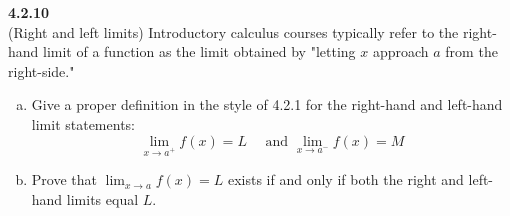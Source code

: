 \textbf{4.2.10}
\\

(Right and left limits) Introductory calculus courses typically refer to the right-hand limit of a function as the limit
obtained by "letting $x$ approach $a$ from the right-side."

\begin{enumerate}[(a)]
\item Give a proper definition in the style of 4.2.1 for the right-hand and left-hand limit statements:
$$
\lim_{x\rightarrow a^+} f(x) = L \quad \text{ and } \lim_{x\rightarrow a^-} f(x) = M
$$

\item Prove that $\lim_{x\rightarrow a} f(x) = L$ exists if and only if both the right and left-hand limits equal $L$.
\end{enumerate}